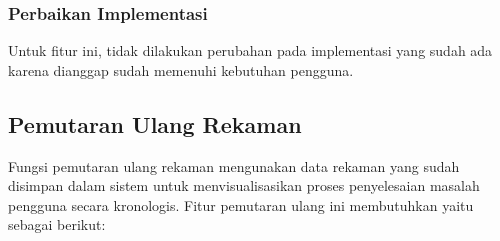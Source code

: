 \subsubsection{Perbaikan Implementasi}

Untuk fitur ini, tidak dilakukan perubahan pada implementasi yang sudah ada karena dianggap sudah memenuhi kebutuhan pengguna.

\subsection{Pemutaran Ulang Rekaman}

Fungsi pemutaran ulang rekaman mengunakan data rekaman yang sudah disimpan dalam sistem untuk menvisualisasikan proses penyelesaian masalah pengguna secara kronologis. Fitur pemutaran ulang ini membutuhkan yaitu sebagai berikut:

